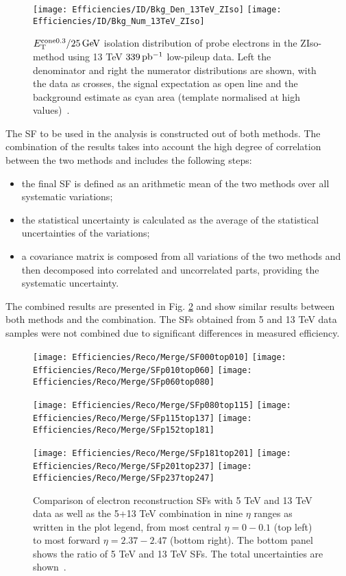     \begin{figure}[htbp]
    \centering
    \texttt{[image: Efficiencies/ID/Bkg\_Den\_13TeV\_ZIso]}
    \texttt{[image: Efficiencies/ID/Bkg\_Num\_13TeV\_ZIso]}
    \caption{$E_{\text{T}}^\mathrm{cone0.3}/25 \,\text{Ge\kern -0.1em V}$ isolation distribution of
    	probe electrons in the ZIso-method using 13 TeV $339\,\mbox{pb\(^{-1}\)}$
    	low-pileup data. Left the denominator and right the numerator
    	distributions are shown, with the data as crosses, the signal \Zee
    	expectation as open line and the background estimate as cyan area
    	(template normalised at high values)~\cite{int_note_electrons}.}
    \label{fig:bkgfit_ziso}
    \end{figure} 
    
    The SF to be used in the analysis is constructed out of both methods. The combination of the results takes into account the high degree of correlation between the two methods and includes the following steps:
    \begin{itemize}
    	\item the final SF is defined as an arithmetic mean of the two methods over all systematic variations;
    	\item the statistical uncertainty is calculated as the average of the statistical uncertainties of the variations;
    	\item a covariance matrix is composed from all variations of the two methods and then decomposed into correlated and uncorrelated parts, providing the systematic uncertainty.
    \end{itemize}
    The combined results are presented in Fig. \ref{fig:reco_merge} and show similar results between both methods and the combination. The SFs obtained from 5 and 13 TeV data samples were not combined due to significant differences in measured efficiency.
    \begin{figure}[htbp]
    	\centering
    	\texttt{[image: Efficiencies/Reco/Merge/SF000top010]}%
    	\texttt{[image: Efficiencies/Reco/Merge/SFp010top060]}%
    	\texttt{[image: Efficiencies/Reco/Merge/SFp060top080]}
    	
    	\texttt{[image: Efficiencies/Reco/Merge/SFp080top115]}%
    	\texttt{[image: Efficiencies/Reco/Merge/SFp115top137]}%
    	\texttt{[image: Efficiencies/Reco/Merge/SFp152top181]}
    	
    	\texttt{[image: Efficiencies/Reco/Merge/SFp181top201]}%
    	\texttt{[image: Efficiencies/Reco/Merge/SFp201top237]}%
    	\texttt{[image: Efficiencies/Reco/Merge/SFp237top247]}
    	
    	\caption{Comparison of electron reconstruction SFs with 5 TeV and 13
    		TeV data as well as the 5+13 TeV combination in nine $\eta$ ranges
    		as written in the plot legend, from most central $\eta=0-0.1$ (top
    		left) to most forward $\eta=2.37-2.47$ (bottom right). The bottom panel shows the ratio
    		of 5 TeV and 13 TeV SFs. The total
    		uncertainties are shown~\cite{int_note_electrons}.}  \label{fig:reco_merge}
    \end{figure}
